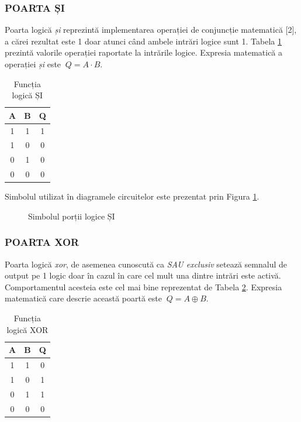 \documentclass[12pt]{article}
\begin{document}
\subsubsection{POARTA ȘI}
Poarta logică \textit{și} reprezintă implementarea operației de conjuncție matematică [2], a cărei rezultat este 1 doar atunci când ambele intrări logice sunt 1. Tabela \ref{Tabela:9} prezintă valorile operației raportate la intrările logice. Expresia matematică a operației \textit{și} este $\ Q = A \cdot B$.
 \begin{table}[h]
\centering
\begin{tabular}{ ||c|c|c|| }
 \hline
 A & B & Q\\ 
 \hline  \hline
 1 & 1 & 1 \\
 \hline
 1 & 0 & 0 \\
 \hline
 0 & 1 & 0 \\
 \hline 
 0 & 0 & 0 \\
 \hline
\end{tabular}
\caption{Funcția logică ȘI}
\label{Tabela:9}
\end{table}

\newpage
Simbolul utilizat în diagramele circuitelor este prezentat prin Figura \ref{Figura:7}.

 \begin{figure}[h!]
 \centering
 \caption{Simbolul porții logice ȘI}
 \label{Figura:7}
 \end{figure}

\subsubsection{POARTA XOR}
Poarta logică \textit{xor}, de asemenea cunoscută ca \textit{SAU exclusiv} setează semnalul de output pe 1 logic doar în cazul în care cel mult una dintre intrări este activă. Comportamentul acesteia este cel mai bine reprezentat de Tabela \ref{Tabela:10}. Expresia matematică care descrie această poartă este $\ Q = A \oplus B$.
\begin{table}[h]
\centering
\begin{tabular}{ ||c|c|c|| }
 \hline
 A & B & Q\\ 
 \hline  \hline
 1 & 1 & 0 \\
 \hline
 1 & 0 & 1 \\
 \hline
 0 & 1 & 1 \\
 \hline 
 0 & 0 & 0 \\
 \hline
\end{tabular}
\caption{Funcția logică XOR}
\label{Tabela:10}
\end{table}
\end{document}
